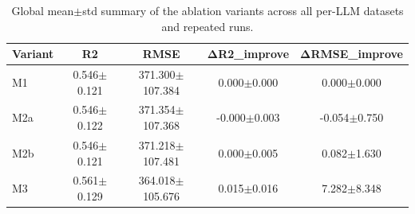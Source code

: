 \begin{table}[t]
\centering
\small
\caption{Global mean$\pm$std summary of the ablation variants across all per-LLM datasets and repeated runs.}
\label{tab:ablation_global}
\begin{tabular}{lcccc}
\toprule
Variant & R2 & RMSE & ΔR2_improve & ΔRMSE_improve \\
\midrule
M1 & 0.546$\pm$0.121 & 371.300$\pm$107.384 & 0.000$\pm$0.000 & 0.000$\pm$0.000 \\
M2a & 0.546$\pm$0.122 & 371.354$\pm$107.368 & -0.000$\pm$0.003 & -0.054$\pm$0.750 \\
M2b & 0.546$\pm$0.121 & 371.218$\pm$107.481 & 0.000$\pm$0.005 & 0.082$\pm$1.630 \\
M3 & 0.561$\pm$0.129 & 364.018$\pm$105.676 & 0.015$\pm$0.016 & 7.282$\pm$8.348 \\
\bottomrule
\end{tabular}
\end{table}